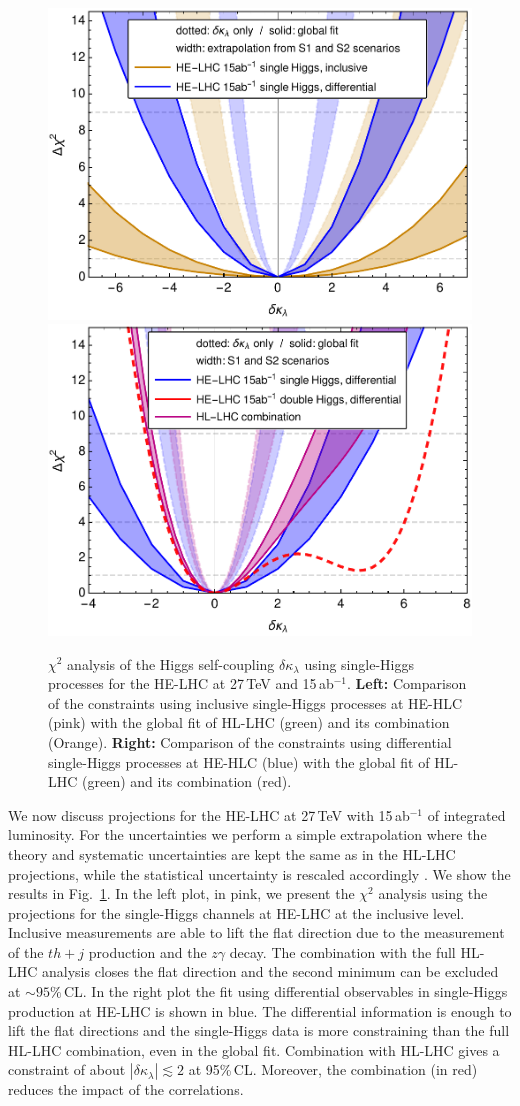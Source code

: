 \begin{figure}
	\centering
	\includegraphics[width=0.45\linewidth]{section3/plots/HEinclusive}\hfill
	\includegraphics[width=0.45\linewidth]{section3/plots/HEdifferential}
	\caption{$\chi^2$ analysis of the Higgs self-coupling $\delta \kappa_\lambda$ using single-Higgs processes for the HE-LHC at 27\,TeV and 15\,ab$^{-1}$. \textbf{Left:} Comparison of the constraints using inclusive single-Higgs processes at HE-HLC (pink) with the global fit of HL-LHC (green) and its combination (Orange). \textbf{Right:} Comparison of the constraints using differential single-Higgs processes at HE-HLC (blue) with the global fit of HL-LHC (green) and its combination (red).}
	\label{fig:helhcchi2}
\end{figure}	


We now discuss projections for the HE-LHC at 27\,TeV with 15\,ab$^{-1}$ of integrated luminosity. For the uncertainties we perform a simple extrapolation where the theory and systematic uncertainties are kept the same as in the HL-LHC projections, while the statistical uncertainty is rescaled accordingly \cite{Goncalves:2018qas}. We show the results in Fig.~\ref{fig:helhcchi2}. In the left plot, in pink, we present the $\chi^2$ analysis using the projections for the single-Higgs channels at HE-LHC at the inclusive level. Inclusive measurements are able to lift the flat direction due to the measurement of the $th+j$ production and the $z\gamma$ decay. The combination with the full HL-LHC analysis closes the flat direction and the second minimum can be excluded at $\sim 95\%$\,CL. In the right plot the fit using differential observables in single-Higgs production at HE-LHC is shown in blue. The differential information is enough to lift the flat directions and the single-Higgs data is more constraining than the full HL-LHC combination, even in the global fit. Combination with HL-LHC gives a constraint of about $|\delta \kappa_\lambda |\lesssim  2$ at 95\%\,CL. Moreover, the combination (in red) reduces the impact of the correlations.
\medskip

